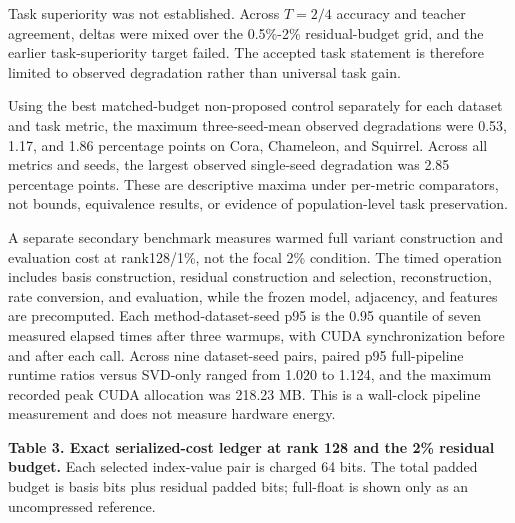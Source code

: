 \documentclass{article}
\begin{document}
\label{sec:task_and_runtime_trade_offs}

Task superiority was not established. Across \(T=2/4\) accuracy and teacher agreement, deltas were mixed over the 0.5\%-2\% residual-budget grid, and the earlier task-superiority target failed. The accepted task statement is therefore limited to observed degradation rather than universal task gain.

Using the best matched-budget non-proposed control separately for each dataset and task metric, the maximum three-seed-mean observed degradations were 0.53, 1.17, and 1.86 percentage points on Cora, Chameleon, and Squirrel. Across all metrics and seeds, the largest observed single-seed degradation was 2.85 percentage points. These are descriptive maxima under per-metric comparators, not bounds, equivalence results, or evidence of population-level task preservation.

A separate secondary benchmark measures warmed full variant construction and evaluation cost at rank128/1\%, not the focal 2\% condition. The timed operation includes basis construction, residual construction and selection, reconstruction, rate conversion, and evaluation, while the frozen model, adjacency, and features are precomputed. Each method-dataset-seed p95 is the 0.95 quantile of seven measured elapsed times after three warmups, with CUDA synchronization before and after each call. Across nine dataset-seed pairs, paired p95 full-pipeline runtime ratios versus SVD-only ranged from 1.020 to 1.124, and the maximum recorded peak CUDA allocation was 218.23 MB. This is a wall-clock pipeline measurement and does not measure hardware energy.

\textbf{Table 3. Exact serialized-cost ledger at rank 128 and the 2\% residual budget.} Each selected index-value pair is charged 64 bits. The total padded budget is basis bits plus residual padded bits; full-float is shown only as an uncompressed reference.

\begin{table}[ht]
\centering
\caption{Comparison of Dataset across Basis bits, Residual target bits, Total padded bits, Selected coefficients}
\label{tab:4}
\end{table}
\end{document}
